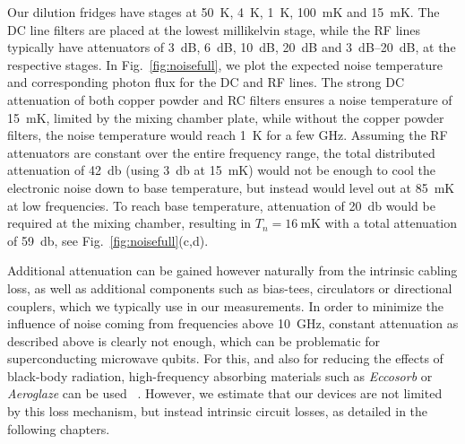 Our dilution fridges have stages at \SI{50}{\kelvin}, \SI{4}{\kelvin}, \SI{1}{\kelvin}, \SI{100}{\milli\kelvin} and \SI{15}{\milli\kelvin}.
%
The DC line filters are placed at the lowest millikelvin stage, while the RF lines typically have attenuators of \SI{3}{dB}, \SI{6}{dB}, \SI{10}{dB}, \SI{20}{dB} and \SIrange{3}{20}{dB}, at the respective stages.
%
In Fig.~\ref{fig:noisefull}, we plot the expected noise temperature and corresponding photon flux for the DC and RF lines.
%
The strong DC attenuation of both copper powder and RC filters ensures a noise temperature of \SI{15}{\milli\kelvin}, limited by the mixing chamber plate, while without the copper powder filters, the noise temperature would reach \SI{1}{\kelvin} for a few \si{\giga\hertz}.
%
Assuming the RF attenuators are constant over the entire frequency range, the total distributed attenuation of \SI{42}{\decibel} (using \SI{3}{\decibel} at \SI{15}{\milli\kelvin}) would not be enough to cool the electronic noise down to base temperature, but instead would level out at \SI{85}{\milli\kelvin} at low frequencies.
%
To reach base temperature, attenuation of \SI{20}{\decibel} would be required at the mixing chamber, resulting in $T_n=\SI{16}{\milli\kelvin}$ with a total attenuation of \SI{59}{\decibel}, see Fig.~\ref{fig:noisefull}(c,d).

Additional attenuation can be gained however naturally from the intrinsic cabling loss, as well as additional components such as bias-tees, circulators or directional couplers, which we typically use in our measurements.
%
In order to minimize the influence of noise coming from frequencies above \SI{10}{\giga\hertz}, constant attenuation as described above is clearly not enough, which can be problematic for superconducting microwave qubits.
%
For this, and also for reducing the effects of black-body radiation, high-frequency absorbing materials such as \textit{Eccosorb} or \textit{Aeroglaze} can be used~ \cite{perskyReviewBlackSurfaces1999,barendsMinimizingQuasiparticleGeneration2011,baselmansUltraLowBackground2012,vanwoerkomOneMinuteParity2015,krinnerEngineeringCryogenicSetups2019}.
%
However, we estimate that our devices are not limited by this loss mechanism, but instead intrinsic circuit losses, as detailed in the following chapters.